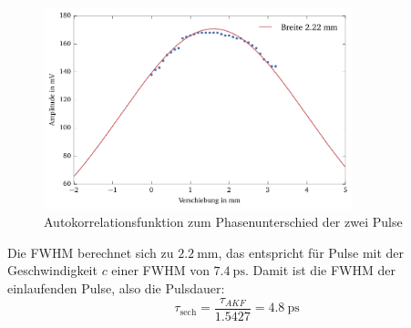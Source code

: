 \documentclass[11pt,twoside=semi]{scrartcl}
\begin{document}
\begin{figure}[H]
  \centering
  \includegraphics[width=0.8\textwidth]{./figures/autokorr_breite.pdf}
  \caption{Autokorrelationsfunktion zum Phasenunterschied der zwei Pulse}
  \label{fig:autokorr_breite}
\end{figure}

Die FWHM berechnet sich zu $\SI{2.2}{\milli\metre}$, das entspricht für Pulse mit der
Geschwindigkeit $c$ einer FWHM von $\SI{7.4}{\pico\second}$.
Damit ist die FWHM der einlaufenden Pulse, also die Pulsdauer:
\begin{equation}
\tau_{\text{sech}} = \frac{\tau_{AKF}}{1.5427} = \SI{4.8}{\pico\second}
\end{equation}
\end{document}

